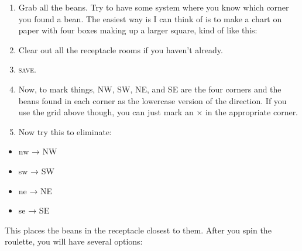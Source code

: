 \documentclass[10pt,twoside,openright]{report}
\providecommand{\tightlist}{%
  \setlength{\itemsep}{0pt}\setlength{\parskip}{0pt}}
\newcommand\textlcsc[1]{\texorpdfstring{\textsc{\MakeLowercase{#1}}}{#1}}
\begin{document}
\begin{enumerate}[leftmargin=*]
\def\labelenumi{\arabic{enumi}.}
\item
  Grab all the beans. Try to have some system where you know which
  corner you found a bean. The easiest way is I can think of is to make
  a chart on paper with four boxes making up a larger square, kind of
  like this:
%
\begin{center}
\end{center}

\item
  Clear out all the receptacle rooms if you haven't already.
\item
  \textlcsc{SAVE}.
\item
  Now, to mark things, NW, SW, NE, and SE are the four corners and the
  beans found in each corner as the lowercase version of the direction.
  If you use the grid above though, you can just mark an $\times$ in the
  appropriate corner.
\item
  Now try this to eliminate:
\end{enumerate}
%
\begin{itemize}
  \tightlist
\item
  nw → NW
\item
  sw → SW
\item
  ne → NE
\item
  se → SE
\end{itemize}

This places the beans in the receptacle closest to them. After you spin
the roulette, you will have several options:
\end{document}

